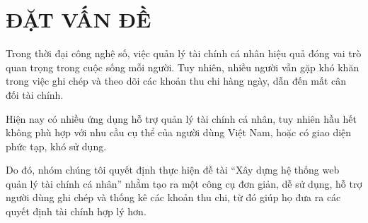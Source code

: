 \clearpage
\setcounter{chapter}{0}
\chapter[{ĐẶT VẤN ĐỀ}]{ĐẶT VẤN ĐỀ}
Trong thời đại công nghệ số, việc quản lý tài chính cá nhân hiệu quả đóng vai trò quan trọng trong cuộc
 sống mỗi người. Tuy nhiên, nhiều người vẫn gặp khó khăn trong việc ghi chép và theo dõi các khoản thu chi 
 hàng ngày, dẫn đến mất cân đối tài chính.

Hiện nay có nhiều ứng dụng hỗ trợ quản lý tài chính cá nhân, tuy nhiên hầu hết không phù hợp với nhu cầu 
cụ thể của người dùng Việt Nam, hoặc có giao diện phức tạp, khó sử dụng.

Do đó, nhóm chúng tôi quyết định thực hiện đề tài “Xây dựng hệ thống web quản lý tài chính cá nhân” 
nhằm tạo ra một công cụ đơn giản, dễ sử dụng, hỗ trợ người dùng ghi chép và thống kê các khoản thu chi,
từ đó giúp họ đưa ra các quyết định tài chính hợp lý hơn.
\clearpage




